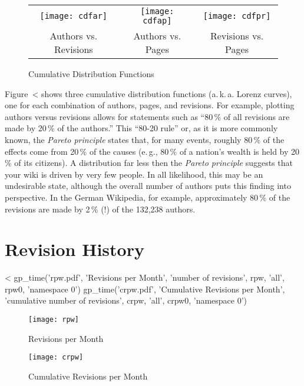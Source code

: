 \documentclass{scrartcl}
\begin{document}
\begin{figure}[htbp]
  \centering
  \begin{tabular}{@{}ccc@{}}
    \texttt{[image: cdfar]} &
    \texttt{[image: cdfap]} &
    \texttt{[image: cdfpr]}\\
    Authors vs. Revisions &
    Authors vs. Pages &
    Revisions vs. Pages
  \end{tabular}
  \caption{Cumulative Distribution Functions}
  \label{fig:cumulative_distribution_functions}
\end{figure}

Figure~<%
shows three cumulative distribution functions (a.\,k.\,a. Lorenz curves), one for each combination of authors, pages, and revisions. For example, plotting authors versus revisions allows for statements such as ``80\,\% of all revisions are made by 20\,\% of the authors.'' This ``80-20 rule'' or, as it is more commonly known, the \emph{Pareto principle} states that, for many events, roughly 80\,\% of the effects come from 20\,\% of the causes (e.\,g., 80\,\% of a nation's wealth is held by 20\,\% of its citizens). A distribution far less then the \emph{Pareto principle} suggests that your wiki is driven by very few people. In all likelihood, this may be an undesirable state, although the overall number of authors puts this finding into perspective. In the German Wikipedia, for example, approximately 80\,\% of the revisions are made by 2\,\% (!) of the 132,238 authors.


\section{Revision History} %
\label{sec:revision_history}

<%
gp_time('rpw.pdf', 'Revisions per Month', 'number of revisions', 
        rpw, 'all', rpw0, 'namespace 0')
gp_time('crpw.pdf', 'Cumulative Revisions per Month', 
        'cumulative number of revisions',
        crpw, 'all', crpw0, 'namespace 0')
\begin{figure}
	\centering
	\texttt{[image: rpw]}
	\caption{Revisions per Month}
	\label{fig:revisions_per_month}
        \vfill

	\texttt{[image: crpw]}
	\caption{Cumulative Revisions per Month}
	\label{fig:cumulative_revisions_per_month}
\end{figure}
\end{document}
